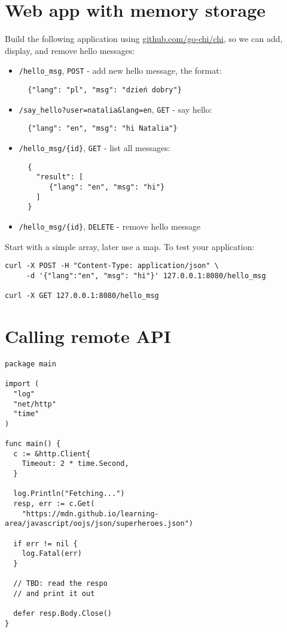 \documentclass[11pt, letterpaper]{article}
\begin{document}
\section{Web app with memory storage}

Build the following application using \href{https://github.com/go-chi/chi}{github.com/go-chi/chi}, so we can add, display, and remove hello messages:

\begin{itemize}
\item \verb|/hello_msg|, \verb|POST| - add new hello message, the format: \begin{verbatim}
  {"lang": "pl", "msg": "dzień dobry"}
  \end{verbatim}

\item \verb|/say_hello?user=natalia&lang=en|, \verb|GET| - say hello: \begin{verbatim}
  {"lang": "en", "msg": "hi Natalia"}
  \end{verbatim}
\item \verb|/hello_msg/{id}|, \verb|GET| - list all messages: \begin{verbatim}
  {
    "result": [
       {"lang": "en", "msg": "hi"}
    ]
  }
  \end{verbatim}
\item \verb|/hello_msg/{id}|, \verb|DELETE| - remove hello message
\end{itemize}

Start with a simple array, later use a map. To test your application:

\begin{verbatim}
curl -X POST -H "Content-Type: application/json" \
     -d '{"lang":"en", "msg": "hi"}' 127.0.0.1:8080/hello_msg

curl -X GET 127.0.0.1:8080/hello_msg
\end{verbatim}

\pagebreak
\section{Calling remote {\small API}}

\begin{verbatim}
package main

import (
  "log"
  "net/http"
  "time"
)

func main() {
  c := &http.Client{
    Timeout: 2 * time.Second,
  }

  log.Println("Fetching...")
  resp, err := c.Get(
    "https://mdn.github.io/learning-area/javascript/oojs/json/superheroes.json")

  if err != nil {
    log.Fatal(err)
  }

  // TBD: read the respo
  // and print it out

  defer resp.Body.Close()
}
\end{verbatim}
\end{document}
